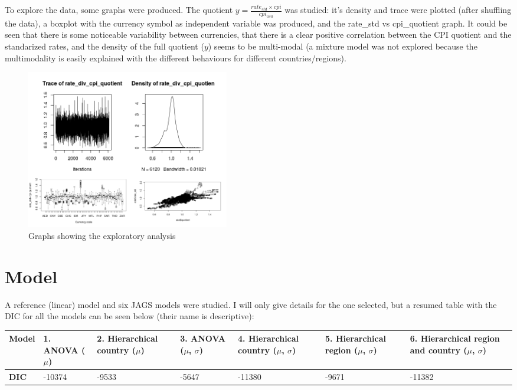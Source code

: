 \documentclass[a4paper,12pt]{article}
\begin{document}
To explore the data, some graphs were produced. The quotient $y = \frac{rate_{std} \times cpi}{cpi_{usa}}$ was studied: it's density and trace were plotted (after shuffling the data), a boxplot with the currency symbol as independent variable was produced, and the rate\_std vs cpi\_quotient graph. It could be seen that there is some noticeable variability between currencies, that there is a clear positive correlation between the CPI quotient and the standarized rates, and the density of the full quotient ($y$) seems to be multi-modal (a mixture model was not explored because the multimodality is easily explained with the different behaviours for different countries/regions).

\begin{figure}[!h]
\centering
\includegraphics[width=3.5in]{images/i006_graphs_exploring.png}
\caption{Graphs showing the exploratory analysis}
\label{fig_raw_data}
\end{figure}


\section{Model}
A reference (linear) model and six JAGS models were studied. I will only give details for the one selected, but a resumed table with the DIC for all the models can be seen below (their name is descriptive):


\begin{tabular}{|p{2cm}|p{2cm}|p{2cm}|p{2cm}|p{2cm}|p{2cm}|p{2cm}|}
\hline
\textbf{Model} &1. ANOVA ($\mu$)&2. Hierarchical country ($\mu$)&3. ANOVA ($\mu$, $\sigma$)&4. Hierarchical country ($\mu$, $\sigma$)&5. Hierarchical region ($\mu$, $\sigma$)&6. Hierarchical region and country ($\mu$, $\sigma$) \\
\hline
\textbf{DIC} & -10374 & -9533 & -5647 & -11380 & -9671 & -11382 \\
\hline
\end{tabular}
\end{document}
